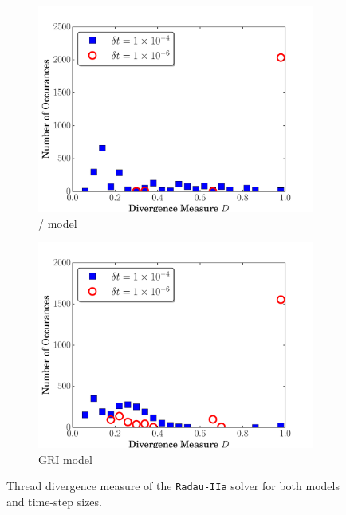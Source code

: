 \documentclass[preprint]{elsarticle}
\begin{document}
\begin{figure}[htb]
  \centering
  \begin{subfigure}{0.49\textwidth}
      \includegraphics[width=\linewidth]{H2_radau2a_div.pdf}
      \caption{\slash{} model}
  \end{subfigure}
  \begin{subfigure}{0.49\textwidth}
      \includegraphics[width=\linewidth]{CH4_radau2a_div.pdf}
      \caption{GRI model}
  \end{subfigure}
  \caption{Thread divergence measure of the \texttt{Radau-IIa} solver for both models and time-step sizes.}
  \label{F:divergence}
\end{figure}
\end{document}

